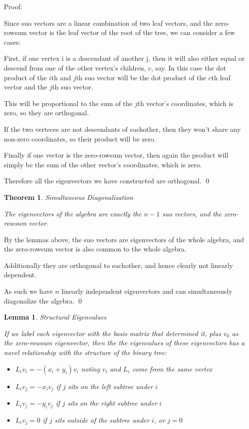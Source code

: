 \documentclass[10pt,a4paper]{report}
\newtheorem{theorem}{Theorem}
\newtheorem{lemma}{Lemma}
\begin{document}
Proof:

Since suo vectors are a linear combination of two leaf vectors, and the
zero-rowsum vector is the leaf vector of the root of the tree, we can consider
a few cases:

First, if one vertex i is a descendant of another j, then it will also either
equal or descend from one of the other vertex's children, c, say.  In this case
the dot product of the $i$th and $j$th suo vector will be the dot product of
the $c$th leaf vector and the $j$th suo vector.

This will be proportional to the sum of the $j$th vector's coordinates, which
is zero, so they are orthogonal.

If the two verteces are not descendants of eachother, then they won't share any
non-zero coordinates, so their product will be zero.

Finally if one vector is the zero-rowsum vector, then again the product will
simply be the sum of the other vector's coordinates, which is zero.

Therefore all the eigenvectors we have constructed are orthogonal. \qed

\begin{theorem} Simultaneous Diagonalization

	The eigenvectors of the algebra are exactly the $n-1$ suo vectors, and the
	zero-rowsum vector.
\end{theorem}

By the lemmas above, the suo vectors are eigenvectors of the whole algebra, and
the zero-rowsum vector is also common to the whole algebra.

Additionally they are orthogonal to eachother, and hence clearly not linearly
dependent.

As such we have $n$ linearly independent eigenvectors and can simultaneously
diagonalize the algebra. \qed

\begin{lemma} Structural Eigenvalues

	If we label each eigenvector with the basis matrix that determined it, plus
	$v_0$ as the zero-rowsum eigenvector, then the the eigenvalues of these
	eigenvectors has a novel relationship with the structure of the binary
	tree:
	\begin{itemize}
		\item ${L_i}{v_i} = -(x_i + y_i)v_i$ noting $v_i$ and $L_i$ come from
			the same vertex
		\item ${L_i}{v_j} = -{x_i}{v_j}$ if $j$ sits on the left subtree under
			$i$
		\item ${L_i}{v_j} = -{y_i}{v_j}$ if $j$ sits on the right subtree under
			$i$
		\item ${L_i}{v_j} = 0$ if $j$ sits outside of the subtree under $i$, or
			$j=0$
	\end{itemize}
\end{lemma}
\end{document}
